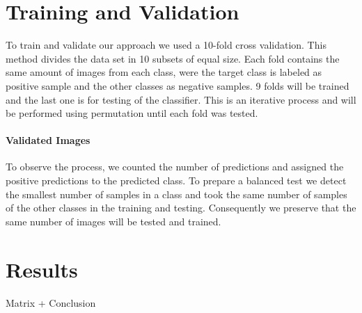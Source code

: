 \documentclass[a4paper,10pt]{article}
\begin{document}
\section{Training and Validation}
To train and validate our approach we used a 10-fold cross validation. 
This method divides the data set in 10 subsets of equal size. Each fold contains the same amount of images from each class, were the target class is labeled as positive sample and the other classes as negative samples. 9 folds will be trained and the last one is for testing of the classifier.
This is an iterative process and will be performed using permutation until each fold was tested.
\paragraph{Validated Images}
To observe the process, we counted the number of predictions and assigned the positive predictions to the predicted class.
To prepare a balanced test we detect the smallest number of samples in a class and took the same number of samples of the other classes in the training and testing. 
Consequently we preserve that the same number of images will be tested and trained.
\section{Results}
Matrix + Conclusion 
\end{document}
